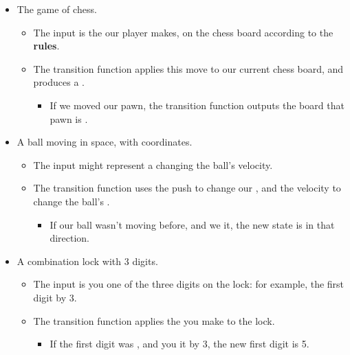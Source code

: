             \begin{itemize}
                \item The game of chess.
                    \begin{itemize}
                        \item The input  is the  our player makes,  on the chess board according to the \textbf{rules}.
                        
                        \item The transition function  applies this move to our current chess board, and produces a .
                            \begin{itemize}
                                \item If we moved our pawn, the transition function outputs the board  that pawn is .
                            \end{itemize}
                    \end{itemize}
                    
                \item A ball moving in space, with coordinates.
                    \begin{itemize}
                        \item The input  might represent a  changing the ball's velocity.
                        
                        \item The transition function  uses the push to change our , and the velocity to change the ball's .
                            \begin{itemize}
                                \item If our ball wasn't moving before, and we  it, the new state is  in that direction.
                            \end{itemize}
                    \end{itemize}
                    
                \item A combination lock with 3 digits.
                    \begin{itemize}
                        \item The input  is you  one of the three digits on the lock: for example,  the first digit by 3.
                        
                        \item The transition function  applies the  you make to the lock.
                            \begin{itemize}
                                \item If the first digit was \2, and you  it by 3, the new first digit is 5.
                            \end{itemize}
                    \end{itemize}
            \end{itemize}
        
